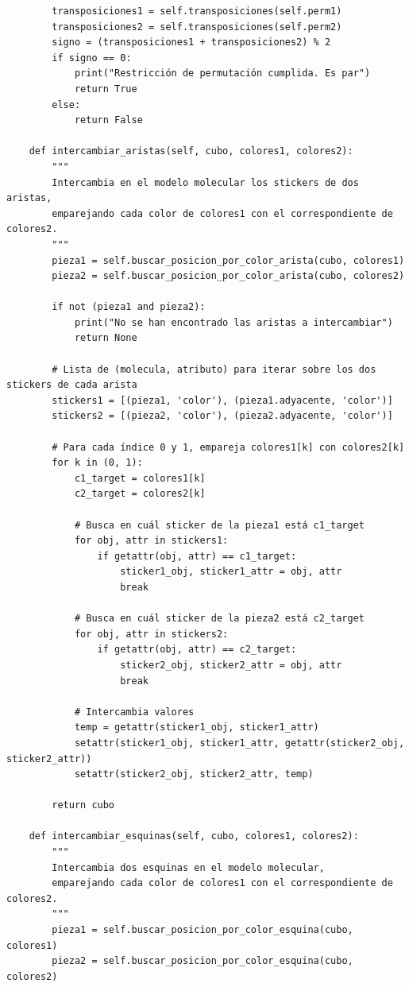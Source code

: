 \begin{lstlisting}
        transposiciones1 = self.transposiciones(self.perm1)
        transposiciones2 = self.transposiciones(self.perm2)
        signo = (transposiciones1 + transposiciones2) % 2
        if signo == 0:
            print("Restricción de permutación cumplida. Es par")
            return True
        else:
            return False
        
    def intercambiar_aristas(self, cubo, colores1, colores2):
        """
        Intercambia en el modelo molecular los stickers de dos aristas, 
        emparejando cada color de colores1 con el correspondiente de colores2.
        """
        pieza1 = self.buscar_posicion_por_color_arista(cubo, colores1)
        pieza2 = self.buscar_posicion_por_color_arista(cubo, colores2)
        
        if not (pieza1 and pieza2):
            print("No se han encontrado las aristas a intercambiar")
            return None

        # Lista de (molecula, atributo) para iterar sobre los dos stickers de cada arista
        stickers1 = [(pieza1, 'color'), (pieza1.adyacente, 'color')]
        stickers2 = [(pieza2, 'color'), (pieza2.adyacente, 'color')]

        # Para cada índice 0 y 1, empareja colores1[k] con colores2[k]
        for k in (0, 1):
            c1_target = colores1[k]
            c2_target = colores2[k]

            # Busca en cuál sticker de la pieza1 está c1_target
            for obj, attr in stickers1:
                if getattr(obj, attr) == c1_target:
                    sticker1_obj, sticker1_attr = obj, attr
                    break

            # Busca en cuál sticker de la pieza2 está c2_target
            for obj, attr in stickers2:
                if getattr(obj, attr) == c2_target:
                    sticker2_obj, sticker2_attr = obj, attr
                    break

            # Intercambia valores
            temp = getattr(sticker1_obj, sticker1_attr)
            setattr(sticker1_obj, sticker1_attr, getattr(sticker2_obj, sticker2_attr))
            setattr(sticker2_obj, sticker2_attr, temp)

        return cubo
        
    def intercambiar_esquinas(self, cubo, colores1, colores2):
        """
        Intercambia dos esquinas en el modelo molecular,
        emparejando cada color de colores1 con el correspondiente de colores2.
        """
        pieza1 = self.buscar_posicion_por_color_esquina(cubo, colores1)
        pieza2 = self.buscar_posicion_por_color_esquina(cubo, colores2)
        

\end{lstlisting}
